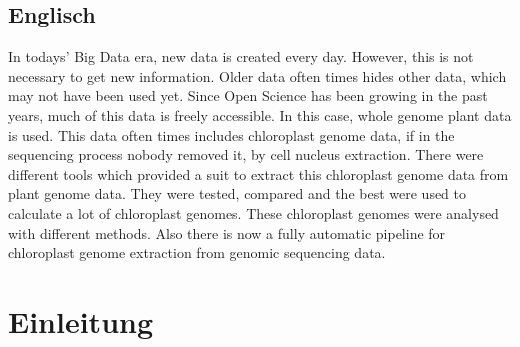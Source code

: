 \documentclass{scrartcl}
\begin{document}
\subsection{Englisch}
\label{sec-1-2}
In todays' Big Data era, new data is created every day. However, this is not necessary to get new information. Older data often times hides other data, which may not have been used yet. Since Open Science has been
growing in the past years, much of this data is freely accessible. In this case, whole genome plant data is used. This data often times includes chloroplast genome data, if in the sequencing process nobody removed
it, by cell nucleus extraction. There were different tools which provided a suit to extract this chloroplast genome data from plant genome data. They were tested, compared and the best were used to calculate 
a lot of chloroplast genomes. These chloroplast genomes were analysed with different methods. Also there is now a fully automatic pipeline for chloroplast genome extraction from genomic sequencing data. 

\clearpage

\section{Einleitung}
\label{sec-2}
\end{document}
